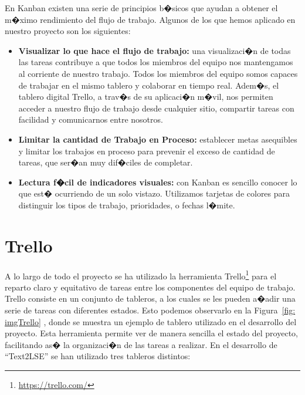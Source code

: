 En Kanban existen una serie de principios b�sicos \citep*{tchKanban2} que ayudan a obtener el m�ximo rendimiento del flujo de trabajo. Algunos de los que hemos aplicado en nuestro proyecto son los siguientes:\\

\begin{itemize}
	
		\item \textbf{Visualizar lo que hace el flujo de trabajo:} una visualizaci�n de todas las tareas contribuye a que todos los miembros del equipo nos mantengamos al corriente de nuestro trabajo. Todos los miembros del equipo somos capaces de trabajar en el mismo tablero y colaborar en tiempo real. Adem�s, el tablero digital Trello, a trav�s de su aplicaci�n m�vil, nos permiten acceder a nuestro flujo de trabajo desde cualquier sitio, compartir tareas con facilidad y comunicarnos entre nosotros.
		
		\item \textbf{Limitar la cantidad de Trabajo en Proceso:} establecer metas asequibles y limitar los trabajos en proceso para prevenir el exceso de cantidad de tareas, que ser�an muy dif�ciles de completar.
		
		\item \textbf{Lectura f�cil de indicadores visuales:} con Kanban es sencillo conocer lo que est� ocurriendo de un solo vistazo. Utilizamos tarjetas de colores para distinguir los tipos de trabajo, prioridades, o fechas l�mite. 

\end{itemize}



\section{Trello}
\label{cap4:sec:Trello}

A lo largo de todo el proyecto se ha utilizado la herramienta Trello\footnote {\url{https://trello.com/}} para el reparto claro y equitativo de tareas entre los componentes del equipo de trabajo. Trello consiste en un conjunto de tableros, a los cuales se les pueden a�adir una serie de tareas con diferentes estados. Esto podemos observarlo en la Figura~\ref {fig: imgTrello} , donde se muestra un ejemplo de tablero utilizado en el desarrollo del proyecto. Esta herramienta permite ver de manera sencilla el estado del proyecto, facilitando as� la organizaci�n de las tareas a realizar. En el desarrollo de ``Text2LSE'' se han utilizado tres tableros distintos:

